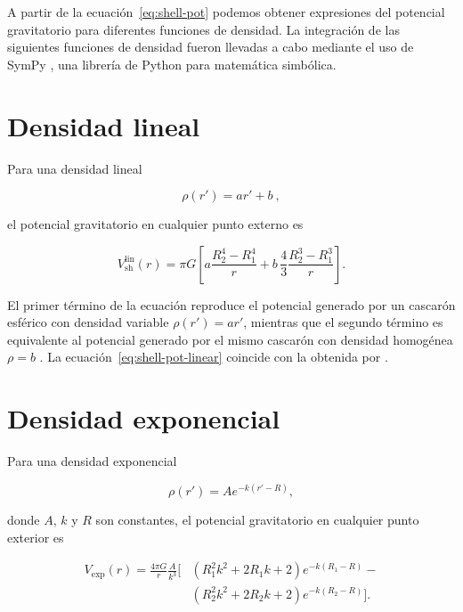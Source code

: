 A partir de la ecuación~\ref{eq:shell-pot} podemos obtener expresiones del
potencial gravitatorio para diferentes funciones de densidad. La integración de
las siguientes funciones de densidad fueron llevadas a cabo mediante el uso de
SymPy \citep{sympy2017}, una librería de Python para matemática simbólica.

\section{Densidad lineal}

Para una densidad lineal

\begin{equation}
    \rho(r') = ar' + b\ ,
\end{equation}

\noindent
el potencial gravitatorio en cualquier punto externo es

\begin{equation}
    V_\text{sh}^\text{lin}(r) = \pi G \left[
    a \frac{R_2^4 - R_1^4}{r} +
    b \,\frac{4}{3} \frac{R_2^3 - R_1^3}{r} \right].
    \label{eq:shell-pot-linear}
\end{equation}

\noindent El primer término de la ecuación reproduce el potencial generado por
un cascarón esférico con densidad variable $\rho(r') = ar'$, mientras que el
segundo término es equivalente al potencial generado por el mismo cascarón con
densidad homogénea $\rho = b$ \citep{mikuska2006,grombein2013}.
La ecuación~\ref{eq:shell-pot-linear} coincide con la obtenida por \citet{lin2019}.

\section{Densidad exponencial}

Para una densidad exponencial

\begin{equation}
    \rho(r') = A e^{- k (r' - R)},
\end{equation}

\noindent donde $A$, $k$ y $R$ son constantes, el potencial gravitatorio en
cualquier punto exterior es

\begin{equation}
    \begin{split}
        V_\text{exp}(r) = \frac{4\pi G}{r} \frac{A}{k^3} \Big[
        & \left( R_1^2 k^2 + 2 R_1 k + 2 \right) e^{- k (R_1 - R)} - \\
        & \left( R_2^2 k^2 + 2 R_2 k + 2 \right) e^{- k (R_2 - R)}
        \Big].
    \end{split}
\end{equation}


